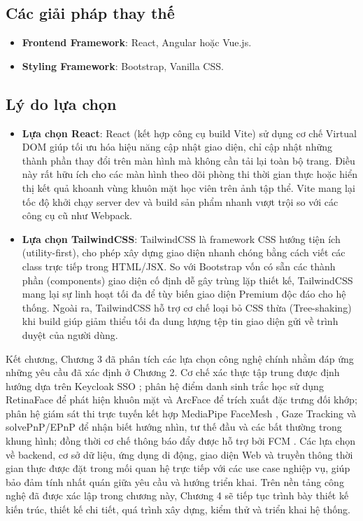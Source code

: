 \documentclass[../DoAn.tex]{subfiles}
\begin{document}
\subsection{Các giải pháp thay thế}
\begin{itemize}
    \item \textbf{Frontend Framework}: React, Angular hoặc Vue.js.
    \item \textbf{Styling Framework}: Bootstrap, Vanilla CSS.
\end{itemize}

\subsection{Lý do lựa chọn}
\begin{itemize}
    \item \textbf{Lựa chọn React}: React (kết hợp công cụ build Vite) sử dụng cơ chế Virtual DOM giúp tối ưu hóa hiệu năng cập nhật giao diện, chỉ cập nhật những thành phần thay đổi trên màn hình mà không cần tải lại toàn bộ trang. Điều này rất hữu ích cho các màn hình theo dõi phòng thi thời gian thực hoặc hiển thị kết quả khoanh vùng khuôn mặt học viên trên ảnh tập thể. Vite mang lại tốc độ khởi chạy server dev và build sản phẩm nhanh vượt trội so với các công cụ cũ như Webpack.
    \item \textbf{Lựa chọn TailwindCSS}: TailwindCSS là framework CSS hướng tiện ích (utility-first), cho phép xây dựng giao diện nhanh chóng bằng cách viết các class trực tiếp trong HTML/JSX. So với Bootstrap vốn có sẵn các thành phần (components) giao diện cố định dễ gây trùng lặp thiết kế, TailwindCSS mang lại sự linh hoạt tối đa để tùy biến giao diện Premium độc đáo cho hệ thống. Ngoài ra, TailwindCSS hỗ trợ cơ chế loại bỏ CSS thừa (Tree-shaking) khi build giúp giảm thiểu tối đa dung lượng tệp tin giao diện gửi về trình duyệt của người dùng.
\end{itemize}

Kết chương, Chương 3 đã phân tích các lựa chọn công nghệ chính nhằm đáp ứng những yêu cầu đã xác định ở Chương 2. Cơ chế xác thực tập trung được định hướng dựa trên Keycloak SSO \cite{keycloak2026}; phân hệ điểm danh sinh trắc học sử dụng RetinaFace \cite{Deng_2020_CVPR} để phát hiện khuôn mặt và ArcFace \cite{Deng_2019_CVPR} để trích xuất đặc trưng đối khớp; phân hệ giám sát thi trực tuyến kết hợp MediaPipe FaceMesh \cite{Lugaresi2019MediaPipe}, Gaze Tracking \cite{kaundinya2026inbrowser} và solvePnP/EPnP \cite{Lepetit2009EPnP} để nhận biết hướng nhìn, tư thế đầu và các bất thường trong khung hình; đồng thời cơ chế thông báo đẩy được hỗ trợ bởi FCM \cite{fcm2026}. Các lựa chọn về backend, cơ sở dữ liệu, ứng dụng di động, giao diện Web và truyền thông thời gian thực được đặt trong mối quan hệ trực tiếp với các use case nghiệp vụ, giúp bảo đảm tính nhất quán giữa yêu cầu và hướng triển khai. Trên nền tảng công nghệ đã được xác lập trong chương này, Chương 4 sẽ tiếp tục trình bày thiết kế kiến trúc, thiết kế chi tiết, quá trình xây dựng, kiểm thử và triển khai hệ thống.
\end{document}
